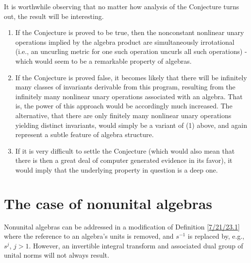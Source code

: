 \documentclass{amsart}
\numberwithin{equation}{section}
\theoremstyle{definition}
\numberwithin{theorem}{section}
\begin{document}
\enlargethispage{1.5cm}
It is worthwhile observing that no matter how analysis of the Conjecture turns out, the result will be interesting.  \begin{enumerate}\item If the Conjecture is proved to be true, then the nonconstant nonlinear unary operations implied by the algebra product are simultaneously irrotational (i.e., an uncurling metric for one such operation uncurls all such operations) - which would seem to be a remarkable property of algebras. \item If the Conjecture is proved false, it becomes likely that there will be infinitely many classes of invariants derivable from this program, resulting from the infinitely many nonlinear unary operations associated with an algebra.  That is, the power of this approach would be accordingly much increased.  The alternative, that there are only finitely many nonlinear unary operations yielding distinct invariants, would simply be a variant of (1) above, and again represent a subtle feature of algebra structure.  \item If it is very difficult to settle the Conjecture (which would also mean that there is then a great deal of computer generated evidence in its favor), it would imply that the underlying property in question is a deep one. \end{enumerate}

\section{The case of nonunital algebras} Nonunital algebras can be addressed in a modification of Definition \ref{7/21/23.1} where the reference to an algebra's units is removed, and $s^{-1}$ is replaced by, e.g., $s^j$, $j>1$.   However, an invertible integral transform and associated dual group of unital norms will not always result.  
\end{document}
